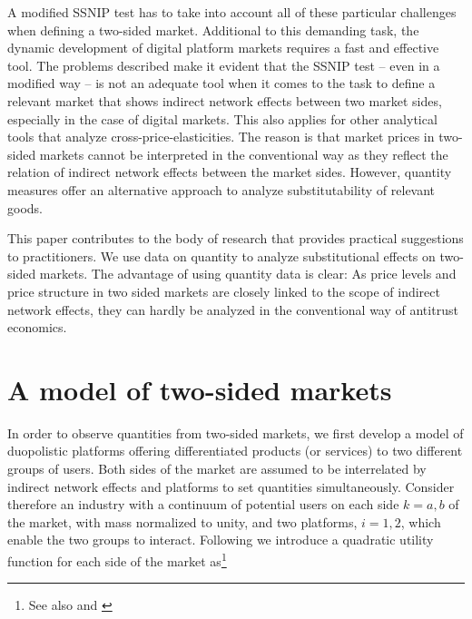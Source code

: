 \documentclass[12pt,a4paper]{scrreprt}
\begin{document}
A modified SSNIP test has to take into account all of these particular challenges when defining a two-sided market. Additional to this demanding task, the dynamic development of digital platform markets requires a fast and effective tool. The problems described make it evident that the SSNIP test – even in a modified way – is not an adequate tool when it comes to the task to define a relevant market that shows indirect network effects between two market sides, especially in the case of digital markets. This also applies for other analytical tools that analyze cross-price-elasticities. The reason is that market prices in two-sided markets cannot be interpreted in the conventional way as they reflect the relation of indirect network effects between the market sides. However, quantity measures offer an alternative approach to analyze substitutability of relevant goods. 

This paper contributes to the body of research that provides practical suggestions to practitioners. We use data on quantity to analyze substitutional effects on two-sided markets. The advantage of using quantity data is clear: As price levels and price structure in two sided markets are closely linked to the scope of indirect network effects, they can hardly be analyzed in the conventional way of antitrust economics. 









\chapter{A model of two-sided markets}\label{model}
In order to observe quantities from two-sided markets, we first develop a model of duopolistic platforms offering differentiated products (or services) to two different groups of users. Both sides of the market are assumed to be interrelated by indirect network effects and platforms to set quantities simultaneously. Consider therefore an industry with a continuum of potential users on each side $k = a,b$ of the market, with mass normalized to unity, and two platforms, $i = 1,2$, which enable the two groups to interact. Following \cite{shubik_market_1980} we introduce a quadratic utility function for each side of the market as\footnote{See also \cite{dixit_model_1979} and \cite{kind_competition_2006}}
\end{document}
